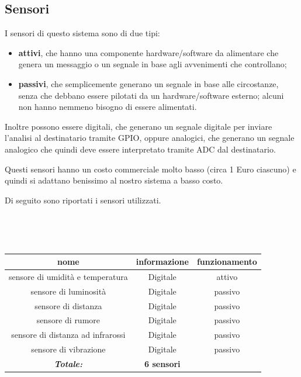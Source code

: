 \documentclass[a4paper,titlepage]{book}
\begin{document}
\subsection{Sensori}

I sensori di questo sistema sono di due tipi:

\begin{itemize}[noitemsep,topsep=10pt,parsep=23pt,partopsep=0pt]

\item \textbf{attivi}, che hanno una componente hardware/software da alimentare che genera un messaggio o un segnale in base agli avvenimenti che controllano;

\item \textbf{passivi}, che semplicemente generano un segnale in base alle circostanze, senza che debbano essere pilotati da un hardware/software esterno; alcuni non hanno nemmeno bisogno di essere alimentati.

\end{itemize}  

Inoltre possono essere digitali, che generano un segnale digitale per inviare l'analisi al destinatario tramite GPIO, oppure analogici, che generano un segnale analogico che quindi deve essere interpretato tramite ADC dal destinatario.

Questi sensori hanno un costo commerciale molto basso (circa 1 Euro ciascuno) e quindi si adattano benissimo al nostro sistema a basso costo.


Di seguito sono riportati i sensori utilizzati.

~

~


\begin{tabular}{|c  c  c|}
\hline
\multicolumn{1}{|c|}{\textbf {nome}} & \multicolumn{1}{|c|}{\textbf {informazione}} & \multicolumn{1}{c|}{\textbf {funzionamento}} \\
\hline

sensore di umidità e temperatura & Digitale	& attivo  \\
sensore di luminosità		& Digitale	& passivo \\
sensore di distanza		& Digitale	& passivo \\
sensore di rumore		& Digitale	& passivo \\
sensore di distanza ad infrarossi & Digitale	& passivo \\
sensore di vibrazione		& Digitale	& passivo \\

\hline

\textit{\textbf{Totale:}}	& \textbf{6 sensori} & \\

\hline
\end{tabular}
\end{document}

